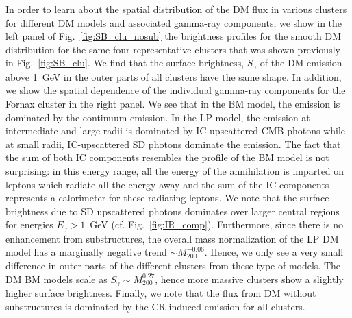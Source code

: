 \documentclass[10pt,aps,pra,reprint,amsmath,amsfonts,amssymb,showpacs,nofootinbib,floatfix]{revtex4-1}
\newcommand{\mvir}{M_{200}}
\begin{document}
In order to learn about the spatial distribution of the DM flux in
various clusters for different DM models and associated gamma-ray
components, we show in the left panel of Fig.~\ref{fig:SB_clu_nosub}
the brightness profiles for the smooth DM distribution for the same
four representative clusters that was shown previously in
Fig.~\ref{fig:SB_clu}.  We find that the surface brightness,
$S_\gamma$ of the DM emission above 1~GeV in the outer parts of all
clusters have the same shape. In addition, we show the spatial
dependence of the individual gamma-ray components for the Fornax
cluster in the right panel. We see that in the BM model, the emission
is dominated by the continuum emission. In the LP model, the emission
at intermediate and large radii is dominated by IC-upscattered CMB
photons while at small radii, IC-upscattered SD photons dominate the
emission. The fact that the sum of both IC components resembles the
profile of the BM model is not surprising: in this energy range, all
the energy of the annihilation is imparted on leptons which radiate
all the energy away and the sum of the IC components represents a
calorimeter for these radiating leptons.  We note that the surface
brightness due to SD upscattered photons dominates over larger central
regions for energies $E_\gamma>1$~GeV (cf. Fig.~\ref{fig:IR_comp}).
Furthermore, since there is no enhancement from substructures, the
overall mass normalization of the LP DM model has a marginally
negative trend $\sim\mvir^{-0.06}$. Hence, we only see a very small
difference in outer parts of the different clusters from these type of
models. The DM BM models scale as $S_\gamma\sim\mvir^{0.27}$,
hence more massive clusters show a slightly higher surface
brightness. Finally, we note that the flux from DM without
substructures is dominated by the CR induced emission for all
clusters.
\end{document}
